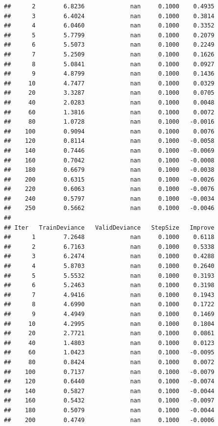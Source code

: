 \documentclass[]{book}
\begin{document}
\begin{verbatim}
##      2        6.8236             nan     0.1000    0.4935
##      3        6.4024             nan     0.1000    0.3814
##      4        6.0460             nan     0.1000    0.3352
##      5        5.7799             nan     0.1000    0.2079
##      6        5.5073             nan     0.1000    0.2249
##      7        5.2509             nan     0.1000    0.1626
##      8        5.0841             nan     0.1000    0.0927
##      9        4.8799             nan     0.1000    0.1436
##     10        4.7477             nan     0.1000    0.0329
##     20        3.3287             nan     0.1000    0.0705
##     40        2.0283             nan     0.1000    0.0048
##     60        1.3816             nan     0.1000    0.0072
##     80        1.0728             nan     0.1000   -0.0016
##    100        0.9094             nan     0.1000    0.0076
##    120        0.8114             nan     0.1000   -0.0058
##    140        0.7446             nan     0.1000   -0.0069
##    160        0.7042             nan     0.1000   -0.0008
##    180        0.6679             nan     0.1000   -0.0038
##    200        0.6315             nan     0.1000   -0.0026
##    220        0.6063             nan     0.1000   -0.0076
##    240        0.5797             nan     0.1000   -0.0034
##    250        0.5662             nan     0.1000   -0.0046
## 
## Iter   TrainDeviance   ValidDeviance   StepSize   Improve
##      1        7.2648             nan     0.1000    0.6118
##      2        6.7163             nan     0.1000    0.5338
##      3        6.2474             nan     0.1000    0.4288
##      4        5.8703             nan     0.1000    0.2640
##      5        5.5532             nan     0.1000    0.3193
##      6        5.2463             nan     0.1000    0.3198
##      7        4.9416             nan     0.1000    0.1943
##      8        4.6990             nan     0.1000    0.1722
##      9        4.4949             nan     0.1000    0.1469
##     10        4.2995             nan     0.1000    0.1804
##     20        2.7721             nan     0.1000    0.0861
##     40        1.4803             nan     0.1000    0.0123
##     60        1.0423             nan     0.1000   -0.0095
##     80        0.8424             nan     0.1000    0.0072
##    100        0.7137             nan     0.1000   -0.0079
##    120        0.6440             nan     0.1000   -0.0074
##    140        0.5827             nan     0.1000   -0.0044
##    160        0.5432             nan     0.1000   -0.0097
##    180        0.5079             nan     0.1000   -0.0044
##    200        0.4749             nan     0.1000   -0.0006

\end{verbatim}
\end{document}
